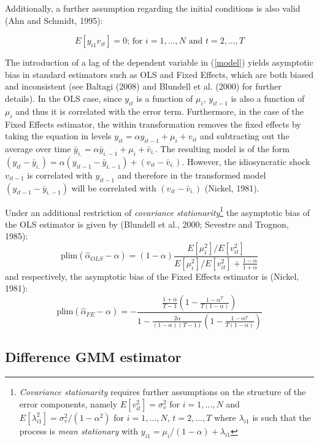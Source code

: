 Additionally, a further assumption regarding the initial conditions is also valid (Ahn and Schmidt, 1995):

\begin{equation}
\label{as3}
\tag{4'}
E\left[y_{i1}v_{it}\right]=0\text{; for $i=1,...,N$ and $t=2,...,T$}
\end{equation}

The introduction of a lag of the dependent variable in (\ref{model}) yields asymptotic bias in standard estimators such as OLS and Fixed Effects, which are both biased and inconsistent (see Baltagi (2008) and Blundell et al. (2000) for further details). In the OLS case, since $y_{it}$ is a function of $\mu_{i}$, $y_{it-1}$ is also a function of $\mu_{i}$ and thus it is correlated with the error term. Furthermore, in the case of the Fixed Effects estimator, the within transformation removes the fixed effects by taking the equation in levels $y_{it}=\alpha y_{it-1} + \mu_i+v_{it}$ and subtracting out the average over time $\bar y_{i.}=\alpha \bar y_{i.-1} +\mu_i +\bar v_{i.}$. The resulting model is of the form $(y_{it}-\bar y_{i.})=\alpha (y_{it-1}-\bar y_{i.-1})+ (v_{it}-\bar v_{i.})$. However, the idiosyncratic shock $v_{it-1}$ is correlated with $y_{it-1}$ and therefore in the transformed model $(y_{it-1}-\bar y_{i.-1})$ will be correlated with $(v_{it}-\bar v_{i.})$ (Nickel, 1981).

Under an additional restriction of \emph{covariance stationarity}\footnote{\emph{Covariance stationarity} requires further assumptions on the structure of the error components, namely $E[v_{it}^2]=\sigma_v^2$ for $i=1,...,N$ and $E[\lambda_{i1}^2]=\sigma_v^2 / (1-\alpha^2)$ for $i=1,...,N$, $t=2,...,T$ where $\lambda_{i1}$ is such that the process is \emph{mean stationary} with $y_{i1}=\mu_{i}/(1-\alpha)+\lambda_{i1}$} the asymptotic bias of the OLS estimator is given by (Blundell et al., 2000; Sevestre and Trognon, 1985):
\[
\text{plim}\left(\hat\alpha_{OLS}-\alpha \right) =\left(1-\alpha\right)\frac{E[\mu_i^2]/E[v_{it}^2]}{E[\mu_i^2]/E[v_{it}^2]+\frac{1-\alpha}{1+\alpha}}
\]
and respectively, the asymptotic bias of the Fixed Effects estimator is (Nickel, 1981):
\[
\text{plim}\left(\hat\alpha_{FE}-\alpha \right)=-\frac{\frac{1+\alpha}{T-1}\left(1-\frac{1-\alpha^T}{T(1-\alpha)}\right)}{1-\frac{2\alpha}{(1-\alpha)(T-1)}\left(1-\frac{1-\alpha^T}{T(1-\alpha)}\right)}
\]

\subsection*{Difference GMM estimator}

